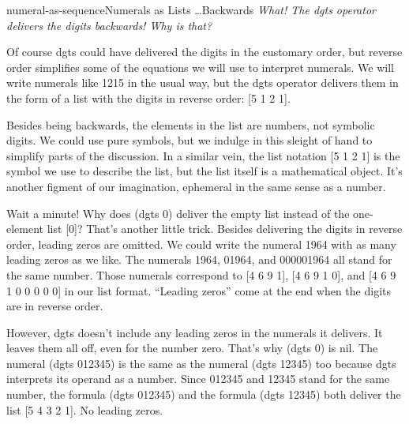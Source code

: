 \begin{aside}{numeral-as-sequence}{Numerals as Lists \dots Backwards}
\emph{What! The \textsf{dgts} operator delivers the digits backwards! Why is that?}

Of course
\textsf{dgts}
could have delivered the digits in the
customary order, but reverse order simplifies some of the
equations we will use to interpret numerals.
We will write numerals like 1215 in the usual way, but
the \textsf{dgts} operator delivers them in the form of
a list with the digits in reverse order: \textsf{[5 1 2 1]}.

Besides being backwards,
the elements in the list are numbers,
not symbolic digits.
We could use pure symbols, but we indulge in
this sleight of hand to
simplify parts of the discussion.
In a similar vein, the list notation \textsf{[5 1 2 1]} is the symbol we use
to describe the
list,
but the list itself is a mathematical object.
It's another figment of our imagination,
ephemeral in the same sense as a number.
\end{aside}

Wait a minute!
Why does \textsf{(dgts 0)} deliver the empty list
instead of the one-element list \textsf{[0]}?
That's another little trick.
Besides delivering the digits in reverse order,
leading zeros are omitted.
We could write the numeral 1964 with as many leading zeros as we like.
The numerals 1964, 01964, and 000001964 all stand for the same number.
Those numerals correspond to
\textsf{[4 6 9 1]}, \textsf{[4 6 9 1 0]}, and \textsf{[4 6 9 1 0 0 0 0 0]}
in our list format. ``Leading zeros'' come at the end when the
digits are in reverse order.

However, \textsf{dgts} doesn't include any
 leading zeros
in the numerals it delivers.
It leaves them all off, even for the number zero.
That's why \textsf{(dgts 0)} is \textsf{nil}.
The numeral \textsf{(dgts 012345)} is
the same as the numeral \textsf{(dgts 12345)} too
because \textsf{dgts} interprets its operand as a number.
Since 012345 and 12345 stand for the same number,
the formula \textsf{(dgts 012345)} and the formula \textsf{(dgts 12345)}
both deliver the list \textsf{[5 4 3 2 1]}.
No leading zeros.

